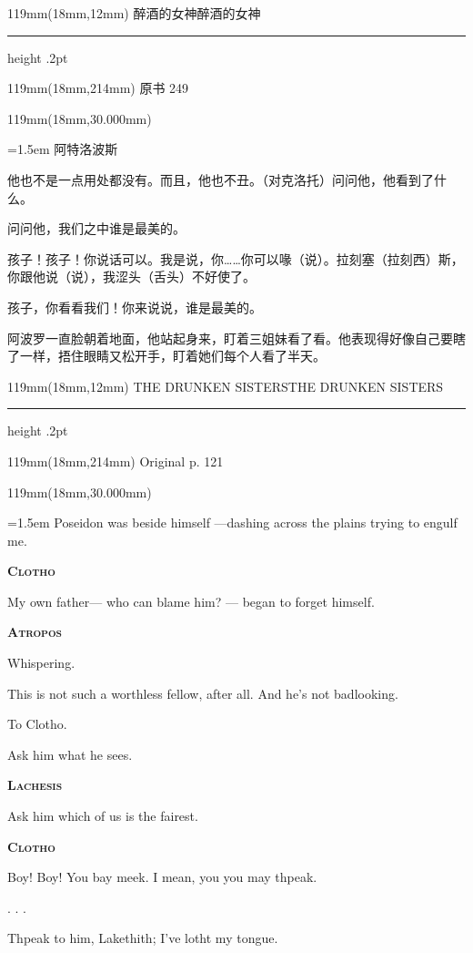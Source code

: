 \documentclass{article}
\newcommand{\ENsetup}{\normalfont\color{ink}\fontsize{11}{16.5}\selectfont\emergencystretch=1.5em}
\newcommand{\ZHsetup}{\normalfont\color{ink}\fontsize{10.5}{17}\selectfont\emergencystretch=1.5em}
\newcommand{\ENspeaker}[1]{{\fontsize{9.8}{13}\selectfont\scshape\bfseries #1}\par\vspace{3pt}}
\newcommand{\ZHspeaker}[1]{{\hei\fontsize{10.3}{13}\selectfont #1}\par\vspace{3pt}}
\newcommand{\Block}[3]{\begin{textblock*}{119mm}(18mm,#1mm){#2 #3\par}\end{textblock*}}
\newcommand{\Heading}[3]{%
  \begin{textblock*}{119mm}(18mm,12mm)
    \color{quiet}\fontsize{7.5}{10}\selectfont
    #1\hfill #2\par\vspace{3mm}\hrule height .2pt
  \end{textblock*}
  \begin{textblock*}{119mm}(18mm,214mm)
    \color{quiet}\fontsize{7}{10}\selectfont #3\hfill\thepage
  \end{textblock*}
}
\begin{document}
\newpage
\null
\Heading{醉酒的女神}{醉酒的女神}{原书 249}
\Block{30.000}{\ZHsetup}{\ZHspeaker{阿特洛波斯}{\kai （轻声地）}他也不是一点用处都没有。而且，他也不丑。{\kai （对克洛托）}问问他，他看到了什么。\par \vspace{2.2mm}\ZHspeaker{拉刻西斯}问问他，我们之中谁是最美的。\par \vspace{2.2mm}\ZHspeaker{克洛托}孩子！孩子！你说话可以。我是说，你……你可以喙{\kai （说）}。拉刻塞{\kai （拉刻西）}斯，你跟他说{\kai （说）}，我涩头{\kai （舌头）}不好使了。\par \vspace{2.2mm}\ZHspeaker{拉刻西斯}孩子，你看看我们！你来说说，谁是最美的。\par \vspace{2.2mm}阿波罗一直脸朝着地面，他站起身来，盯着三姐妹看了看。他表现得好像自己要瞎了一样，捂住眼睛又松开手，盯着她们每个人看了半天。\par }
\newpage
\null
\Heading{THE DRUNKEN SISTERS}{THE DRUNKEN SISTERS}{Original p. 121}
\Block{30.000}{\ENsetup}{\sloppy
Poseidon was beside himself —dashing across the plains trying to engulf me.\par\vspace{2pt}
\ENspeaker{Clotho}
My own father— who can blame him? — began to forget himself.\par\vspace{2pt}
\ENspeaker{Atropos}
Whispering.\par\vspace{2pt}
This is not such a worthless fellow, after all. And he's not badlooking.\par\vspace{2pt}
To Clotho.\par\vspace{2pt}
Ask him what he sees.\par\vspace{2pt}
\ENspeaker{Lachesis}
Ask him which of us is the fairest.\par\vspace{2pt}
\ENspeaker{Clotho}
Boy! Boy! You bay meek. I mean, you you may thpeak.\par\vspace{2pt}
. . .\par\vspace{2pt}
Thpeak to him, Lakethith; I've lotht my tongue.\par\vspace{2pt}}
\end{document}
